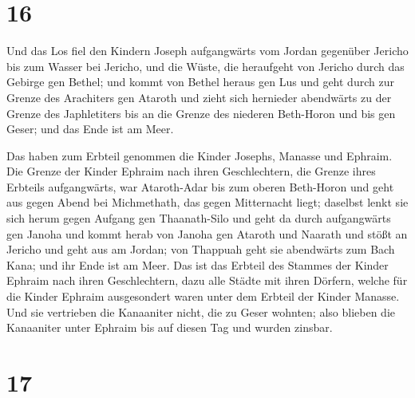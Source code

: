 \hypertarget{section-15}{%
\section{16}\label{section-15}}

 Und das Los fiel den Kindern Joseph aufgangwärts vom
Jordan gegenüber Jericho bis zum Wasser bei Jericho, und die Wüste, die
heraufgeht von Jericho durch das Gebirge gen Bethel;  und
kommt von Bethel heraus gen Lus und geht durch zur Grenze des Arachiters
gen Ataroth  und zieht sich hernieder abendwärts zu der
Grenze des Japhletiters bis an die Grenze des niederen Beth-Horon und
bis gen Geser; und das Ende ist am Meer.

 Das haben zum Erbteil genommen die Kinder Josephs,
Manasse und Ephraim.  Die Grenze der Kinder Ephraim nach
ihren Geschlechtern, die Grenze ihres Erbteils aufgangwärts, war
Ataroth-Adar bis zum oberen Beth-Horon  und geht aus gegen
Abend bei Michmethath, das gegen Mitternacht liegt; daselbst lenkt sie
sich herum gegen Aufgang gen Thaanath-Silo und geht da durch
aufgangwärts gen Janoha  und kommt herab von Janoha gen
Ataroth und Naarath und stößt an Jericho und geht aus am Jordan;
 von Thappuah geht sie abendwärts zum Bach Kana; und ihr
Ende ist am Meer. Das ist das Erbteil des Stammes der Kinder Ephraim
nach ihren Geschlechtern,  dazu alle Städte mit ihren
Dörfern, welche für die Kinder Ephraim ausgesondert waren unter dem
Erbteil der Kinder Manasse.  Und sie vertrieben die
Kanaaniter nicht, die zu Geser wohnten; also blieben die Kanaaniter
unter Ephraim bis auf diesen Tag und wurden zinsbar.

\hypertarget{section-16}{%
\section{17}\label{section-16}}

